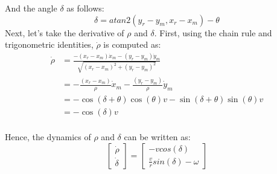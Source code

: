 \documentclass[a4paper, 11pt]{article}
\begin{document}
And the angle $\delta$ as follows:
\begin{equation}
\delta = atan2(y_r-y_m, x_r-x_m) - \theta
\end{equation}
Next, let's take the derivative of $\rho$ and $\delta$. First, using the chain rule and trigonometric identities, $\dot{\rho}$ is computed as:
\begin{equation}
\begin{aligned}
	\dot{\rho} 
	&= \frac{-(x_r - x_m)\dot{x}_m - (y_r - y_m)\dot{y}_m}{\sqrt{(x_r - x_m)^2 + (y_r - y_m)^2} }\\
	&= -\frac{(x_r - x_m)}{\rho} \dot{x}_m - \frac{(y_r - y_m)}{\rho}\dot{y}_m\\
	&= -\cos(\delta + \theta) \cos(\theta)v - \sin(\delta + \theta) \sin(\theta)v\\
	&= -\cos(\delta) v\\
\end{aligned}
\end{equation}

Hence, the dynamics of $\rho$ and $\delta$ can be written as:
\begin{equation}
\begin{bmatrix}
\dot{\rho}\\[6pt]
\dot{\delta}
\end{bmatrix}
= 
\begin{bmatrix}
-vcos(\delta)\\[6pt]
\frac{v}{r}sin(\delta) - \omega
\end{bmatrix}
\end{equation}
\end{document}
